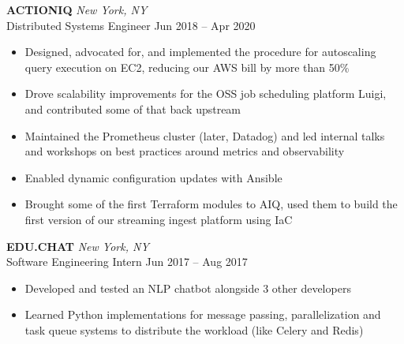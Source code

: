 \documentclass[letterpaper]{article}
\begin{document}
\begin{bgbox}[height=\paperheight, colback=white, width=0.62\textwidth]
\begin{itemize} [noitemsep,topsep=4pt]
		\end{itemize}
		\vspace*{12pt}
		\textbf{ACTIONIQ} \hfill \textit{New York, NY}\\
		Distributed Systems Engineer \hfill Jun 2018 -- Apr 2020
		\begin{itemize} [noitemsep,topsep=4pt]
			\item Designed, advocated for, and implemented the procedure for autoscaling query execution on EC2, reducing our AWS bill by more than 50\%
			\item Drove scalability improvements for the OSS job scheduling platform Luigi, and contributed some of that back upstream
			\item Maintained the Prometheus cluster (later, Datadog) and led internal talks and workshops on best practices around metrics and observability
			\item Enabled dynamic configuration updates with Ansible
			\item Brought some of the first Terraform modules to AIQ, used them to build \linebreak the first version of our streaming ingest platform using IaC
		\end{itemize}
		\vspace*{12pt}
		\textbf{EDU.CHAT} \hfill \textit{New York, NY}\\
		Software Engineering Intern \hfill Jun 2017 -- Aug 2017
		\begin{itemize} [noitemsep,topsep=4pt]
			\item Developed and tested an NLP chatbot alongside 3 other developers
			\item Learned Python implementations for message passing, parallelization and task queue systems to distribute the workload (like Celery and Redis)
		\end{itemize}
	\end{bgbox}%
\end{document}
